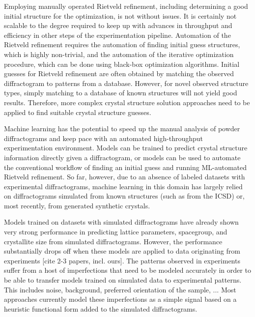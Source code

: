 Employing manually operated Rietveld refinement, including determining a good initial structure for the optimization, is not without issues.
It is certainly not scalable to the degree required to keep up with advances in throughput and efficiency in other steps of the experimentation pipeline.
Automation of the Rietveld refinement requires the automation of finding initial guess structures, which is highly non-trivial, and the automation of the iterative optimization procedure, which can be done using black-box optimization algorithms. \cite{Ozaki2020} 
Initial guesses for Rietveld refinement are often obtained by matching the observed diffractogram to patterns from a database.
However, for novel observed structure types, simply matching to a database of known structures will not yield good results. Therefore, more complex crystal structure solution approaches need to be applied to find suitable crystal structure guesses.

Machine learning has the potential to speed up the manual analysis of powder diffractograms and keep pace with an automated high-throughput experimentation environment. \cite{Agrawal2019, Surdu2023}
Models can be trained to predict crystal structure information directly given a diffractogram, or models can be used to automate the conventional workflow of finding an initial guess and running ML-automated Rietveld refinement. \cite{Surdu2023}    \cite{Feng2019} 
So far, however, due to an absence of labeled datasets with experimental diffractograms, machine learning in this domain has largely relied on diffractograms simulated from known structures (such as from the ICSD) or, most recently, from generated synthetic crystals. \cite{Wang2020, Lee2023} 

Models trained on datasets with simulated diffractograms have already shown very strong performance in predicting
lattice parameters, spacegroup, and crystallite size from simulated diffractograms.
However, the performance substantially drops off when these models are applied to data originating from experiments [cite 2-3 papers, incl. ours].
The patterns observed in experiments suffer from a host of imperfections that need to be modeled accurately in order to be able to transfer models trained on simulated data to experimental patterns. This includes noise, background, preferred orientation of the sample, ...
Most approaches currently model these imperfections as a simple signal based on a heuristic functional form added to the simulated diffractograms.

